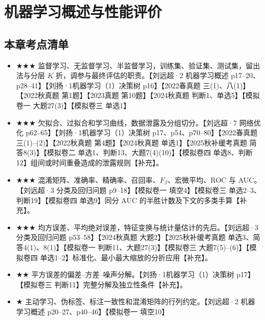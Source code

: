\documentclass[UTF8,a4paper,zihao=-4,fontset=fandol]{ctexrep}
\begin{document}
\chapter{机器学习概述与性能评价}
\section{本章考点清单}
\begin{itemize}[leftmargin=2em]
\item \(\bigstar \bigstar \bigstar\) 监督学习、无监督学习、半监督学习，训练集、验证集、测试集，留出法与分层 \(K\) 折，调参与最终评估的职责。【刘远超·2 机器学习概述 p17--20、p28--41】【刘扬·1机器学习（1）决策树 p16】【2022春真题 三(1)、八(1)】【2022秋真题 第1题】【2023真题 第10题】【2024秋真题 判断1、单选5】【模拟卷一 大题27(3)】【模拟卷三 单选1】
\item \(\bigstar \bigstar \bigstar\) 欠拟合、过拟合和学习曲线，数据泄露及分组切分。【刘远超·7 网络优化 p62--65】【刘扬·1机器学习（1）决策树 p17、p54、p70--80】【2022春真题 三(1)--(2)】【2022秋真题 第4题】【2024秋真题 单选1】【2025秋补缓考真题 简答8(3)】【模拟卷二 单选1、判断13、大题7(4)(10)】【模拟卷四 单选8、判断12】组间或时间重叠造成的泄露规则【补充】。
\item \(\bigstar \bigstar \bigstar\) 混淆矩阵、准确率、精确率、召回率、\(F_\beta\)、宏微平均、ROC 与 AUC。【刘远超·3 分类及回归问题 p9--18】【模拟卷一 填空4】【模拟卷三 单选2--3、判断19】【模拟卷四 单选9】同分 AUC 的半胜计数及下文的多类手算【补充】。
\item \(\bigstar \bigstar \bigstar\) 均方误差、平均绝对误差，特征变换与统计量估计的先后。【刘远超·3 分类及回归问题 p53--58】【2024秋真题 大题2】【2025秋补缓考真题 单选3、简答4(1)、8(1)】【模拟卷一 判断11、大题27(3)】【模拟卷三 大题7(5)--(6)】【模拟卷四 单选1--2】标准化、最小最大缩放的分折应用【补充】。
\item \(\bigstar \bigstar\) 平方误差的偏差--方差--噪声分解。【刘扬·1机器学习（1）决策树 p17】【模拟卷三 判断11】完整分解及独立性条件【补充】。
\item \(\bigstar\) 主动学习、伪标签、标注一致性和混淆矩阵的行列约定。【刘远超·2 机器学习概述 p20--27、p40--46】【模拟卷一 填空10】
\end{itemize}
\end{document}
